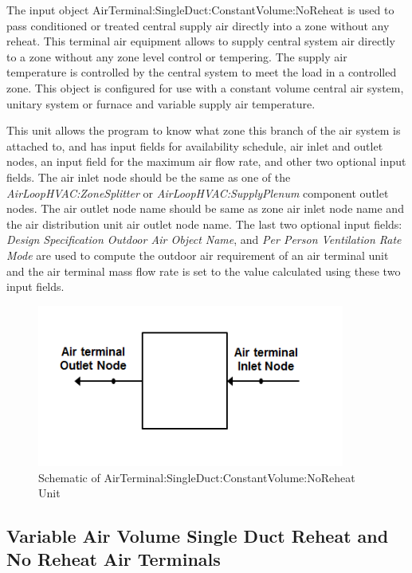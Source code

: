 The input object AirTerminal:SingleDuct:ConstantVolume:NoReheat is used to pass conditioned or treated central supply air directly into a zone without any reheat. This terminal air equipment allows to supply central system air directly to a zone without any zone level control or tempering. The supply air temperature is controlled by the central system to meet the load in a controlled zone. This object is configured for use with a constant volume central air system, unitary system or furnace and variable supply air temperature. 

This unit allows the program to know what zone this branch of the air system is attached to, and has input fields for availability schedule, air inlet and outlet nodes, an input field for the maximum air flow rate, and other two optional input fields. The air inlet node should be the same as one of the \emph{AirLoopHVAC:ZoneSplitter} or \emph{AirLoopHVAC:SupplyPlenum} component outlet nodes. The air outlet node name should be same as zone air inlet node name and the air distribution unit air outlet node name. The last two optional input fields: \textit{Design Specification Outdoor Air Object Name}, and \textit{Per Person Ventilation Rate Mode} are used to compute the outdoor air requirement of an air terminal unit and the air terminal mass flow rate is set to the value calculated using these two input fields. 

\begin{figure}[hbtp] %
\centering
\includegraphics[width=0.9\textwidth, height=0.9\textheight, keepaspectratio=true]{media/SingleDuctConstantVolumeNoReheatAT.png}
\caption{Schematic of AirTerminal:SingleDuct:ConstantVolume:NoReheat Unit \protect \label{fig:schematic-of-airterminal-singleduct}}
\end{figure}

\subsection{Variable Air Volume Single Duct Reheat and No Reheat Air Terminals}\label{variable-air-volume-single-duct-reheat-and-no-reheat-air-terminals}

